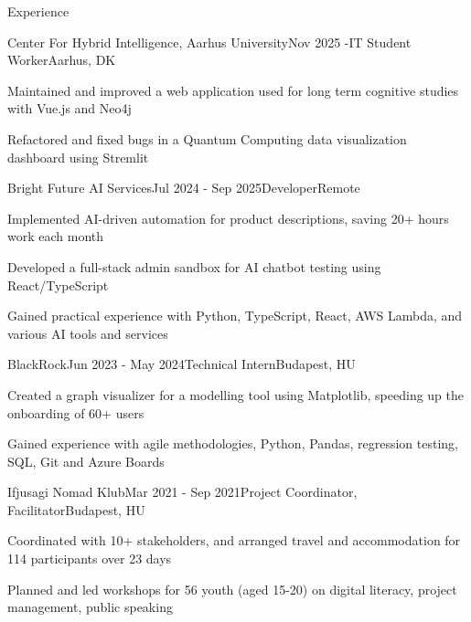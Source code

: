 \documentclass[
	a4paper, %
	11pt, %
]{resume} %
\begin{document}
\begin{rSection}{Experience}

	\begin{rSubsection}{Center For Hybrid Intelligence, Aarhus University}{Nov 2025 -}{IT Student Worker}{Aarhus, DK}
		\item Maintained and improved a web application used for long term cognitive studies with Vue.js and Neo4j
		\item Refactored and fixed bugs in a Quantum Computing data visualization dashboard using Stremlit
	\end{rSubsection}

	\begin{rSubsection}{Bright Future AI Services}{Jul 2024 - Sep 2025}{Developer}{Remote}
		\item Implemented AI-driven automation for product descriptions, saving 20+ hours work each month
		\item Developed a full-stack admin sandbox for AI chatbot testing using React/TypeScript
		\item Gained practical experience with Python, TypeScript, React, AWS Lambda, and various AI tools and services
	\end{rSubsection}

	\begin{rSubsection}{BlackRock}{Jun 2023 - May 2024}{Technical Intern}{Budapest, HU}
		\item Created a graph visualizer for a modelling tool using Matplotlib, speeding up the onboarding of 60+ users
		\item Gained experience with agile methodologies, Python, Pandas, regression testing, SQL, Git and Azure Boards
	\end{rSubsection}

	\begin{rSubsection}{Ifjusagi Nomad Klub}{Mar 2021 - Sep 2021}{Project Coordinator, Facilitator}{Budapest, HU}
		\item Coordinated with 10+ stakeholders, and arranged travel and accommodation for 114 participants over 23 days
		\item Planned and led workshops for 56 youth (aged 15-20) on digital literacy, project management, public speaking
	\end{rSubsection}

\end{rSection}

\end{document}
